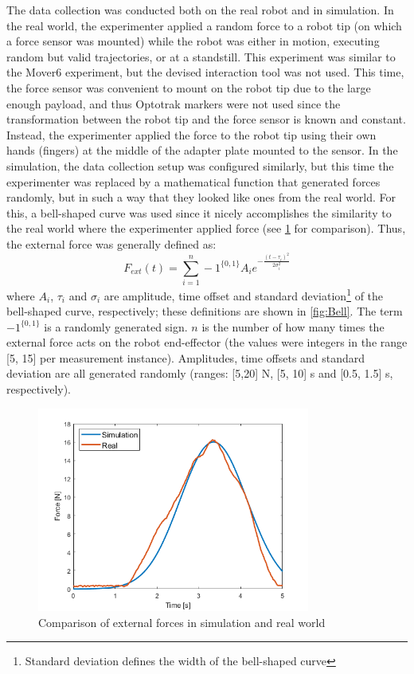 The data collection was conducted both on the real robot and in simulation. In the real world, the experimenter applied a random force to a robot tip (on which a force sensor was mounted) while the robot was either in motion, executing random but valid trajectories, or at a standstill. This experiment was similar to the Mover6 experiment, but the devised interaction tool was not used. This time, the force sensor was convenient to mount on the robot tip due to the large enough payload, and thus Optotrak markers were not used since the transformation between the robot tip and the force sensor is known and constant. Instead, the experimenter applied the force to the robot tip using their own hands (fingers) at the middle of the adapter plate mounted to the sensor. In the simulation, the data collection setup was configured similarly, but this time the experimenter was replaced by a mathematical function that generated forces randomly, but in such a way that they looked like ones from the real world. For this, a bell-shaped curve was used since it nicely accomplishes the similarity to the real world where the experimenter applied force (see \cref{fig:FextSimReal} for comparison). Thus, the external force was generally defined as:
\[
F_{ext}(t) = \sum^n_{i=1}-1^{\{0,1\}}A_i e^{-\frac{(t-\tau_i)^2}{2\sigma_i^2}}
\]
where $A_i$, $\tau_i$ and $\sigma_i$ are amplitude, time offset and standard deviation\footnote{Standard deviation defines the width of the bell-shaped curve} of the bell-shaped curve, respectively; these definitions are shown in \cref{fig:Bell}. The term $-1^{\{0,1\}}$ is a randomly generated sign. $n$ is the number of how many times the external force acts on the robot end-effector (the values were integers in the range [5, 15] per measurement instance). Amplitudes, time offsets and standard deviation are all generated randomly (ranges: [5,20] N, [5, 10] s and [0.5, 1.5] s, respectively). 

\begin{figure}
    \centering
    \includegraphics[width=0.8\textwidth]{slike/Fig03_22.png}
    \caption{Comparison of external forces in simulation and real world}
    \label{fig:FextSimReal}
\end{figure}

